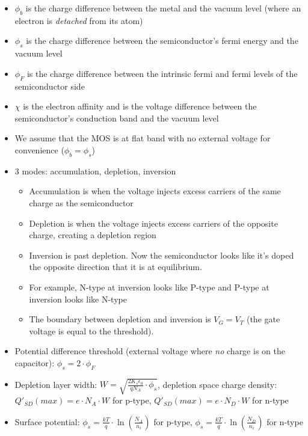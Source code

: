 \documentclass{article}
\begin{document}
\begin{itemize}
    \item $\phi_b$ is the charge difference between the metal and the vacuum level (where an electron is \textit{detached} from its atom)
    \item $\phi_s$ is the charge difference between the semiconductor's fermi energy and the vacuum level
    \item $\phi_F$ is the charge difference between the intrinsic fermi and fermi levels of the semiconductor side
    \item $\chi$ is the electron affinity and is the voltage difference between the semiconductor's conduction band and the vacuum level
    \item We assume that the MOS is at flat band with no external voltage for convenience ($\phi_b = \phi_s$)
    \item 3 modes: accumulation, depletion, inversion
    \begin{itemize}
        \item Accumulation is when the voltage injects excess carriers of the same charge as the semiconductor
        \item Depletion is when the voltage injects excess carriers of the opposite charge, creating a depletion region
        \item Inversion is past depletion. Now the semiconductor looks like it's doped the opposite direction that it is at equilibrium.
        \item For example, N-type at inversion looks like P-type and P-type at inversion looks like N-type
        \item The boundary between depletion and inversion is $V_G = V_T$ (the gate voltage is equal to the threshold).
    \end{itemize}
    \item Potential difference threshold (external voltage where \textit{no} charge is on the capacitor): $\phi_s = 2 \cdot \phi_F$
    \item Depletion layer width: $W = \sqrt{\frac{2 K_s \epsilon_0}{q N_A} \cdot \phi_s}$, depletion space charge density: $Q'_{SD}(max) = e \cdot N_A \cdot W$ for p-type, $Q'_{SD}(max) = e \cdot N_D \cdot W$ for n-type
    \item Surface potential: $\phi_s = \frac{kT}{q} \cdot \ln\left(\frac{N_A}{n_i}\right)$ for p-type, $\phi_s = \frac{kT}{q} \cdot \ln\left(\frac{N_D}{n_i}\right)$ for n-type
\end{itemize}
\end{document}
